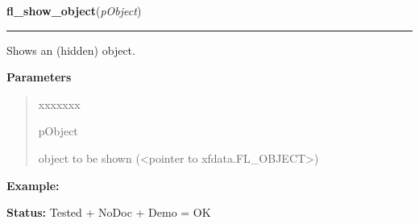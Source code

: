 \hspace{.8\funcindent}\begin{boxedminipage}{\funcwidth}

    \raggedright \textbf{fl\_show\_object}(\textit{pObject})

    \vspace{-1.5ex}

    \rule{\textwidth}{0.5\fboxrule}
\setlength{\parskip}{2ex}
    Shows an (hidden) object.

\setlength{\parskip}{1ex}
      \textbf{Parameters}
      \vspace{-1ex}

      \begin{quote}
        \begin{Ventry}{xxxxxxx}

          \item[pObject]

          object to be shown ({\textless}pointer to 
          xfdata.FL\_OBJECT{\textgreater})

        \end{Ventry}

      \end{quote}

\textbf{Example:} 

\textbf{Status:} Tested + NoDoc + Demo = OK



    \end{boxedminipage}

    \label{xformslib:library:fl_hide_object}

    \vspace{0.5ex}

